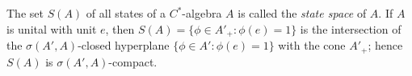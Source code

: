 The set $S(A)$ of all states of a $C^*$-algebra $A$ is called the \textit{state space} of $A$. If $A$ is unital with unit $e$, then $S(A) = \{\phi \in A'_+ : \phi(e) = 1\}$ is the intersection of the $\sigma(A', A)$-closed hyperplane $\{\phi \in A' : \phi(e) = 1\}$ with the cone $A'_+$; hence $S(A)$ is $\sigma(A', A)$-compact.
